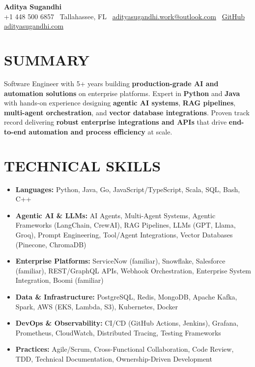 \documentclass[letterpaper,10pt]{article}
\newcommand{\resumeItem}[1]{\item\small #1}
\begin{document}
\begin{center}
{\huge\textbf{Aditya Sugandhi}} \\
+1 448 500 6857 \textbar\ \textcolor{metablue}{Tallahassee, FL} \textbar\
\href{mailto:adityasugandhi.work@outlook.com}{adityasugandhi.work@outlook.com} \textbar\
\href{https://github.com/adityasugandhi}{GitHub}
\textbar \href{https://adityasugandhi.com}{adityasugandhi.com}
\end{center}
\vspace{-12pt}

\section{\textcolor{metablue}{SUMMARY}}
\small
\vspace{-6pt}
Software Engineer with 5+ years building \textbf{production-grade AI and automation solutions} on enterprise platforms. Expert in \textbf{Python} and \textbf{Java} with hands-on experience designing \textbf{agentic AI systems}, \textbf{RAG pipelines}, \textbf{multi-agent orchestration}, and \textbf{vector database integrations}. Proven track record delivering \textbf{robust enterprise integrations and APIs} that drive \textbf{end-to-end automation and process efficiency} at scale.

\vspace{-9pt}

\section{\textcolor{metablue}{TECHNICAL SKILLS}}
\vspace{-5pt}
\small
\begin{itemize}
\resumeItem{\textbf{Languages:} Python, Java, Go, JavaScript/TypeScript, Scala, SQL, Bash, C++}
\resumeItem{\textbf{Agentic AI \& LLMs:} AI Agents, Multi-Agent Systems, Agentic Frameworks (LangChain, CrewAI), RAG Pipelines, LLMs (GPT, Llama, Groq), Prompt Engineering, Tool/Agent Integrations, Vector Databases (Pinecone, ChromaDB)}
\resumeItem{\textbf{Enterprise Platforms:} ServiceNow (familiar), Snowflake, Salesforce (familiar), REST/GraphQL APIs, Webhook Orchestration, Enterprise System Integration, Boomi (familiar)}
\resumeItem{\textbf{Data \& Infrastructure:} PostgreSQL, Redis, MongoDB, Apache Kafka, Spark, AWS (EKS, Lambda, S3), Kubernetes, Docker}
\resumeItem{\textbf{DevOps \& Observability:} CI/CD (GitHub Actions, Jenkins), Grafana, Prometheus, CloudWatch, Distributed Tracing, Testing Frameworks}
\resumeItem{\textbf{Practices:} Agile/Scrum, Cross-Functional Collaboration, Code Review, TDD, Technical Documentation, Ownership-Driven Development}
\end{itemize}
\vspace{-10pt}
\end{document}

